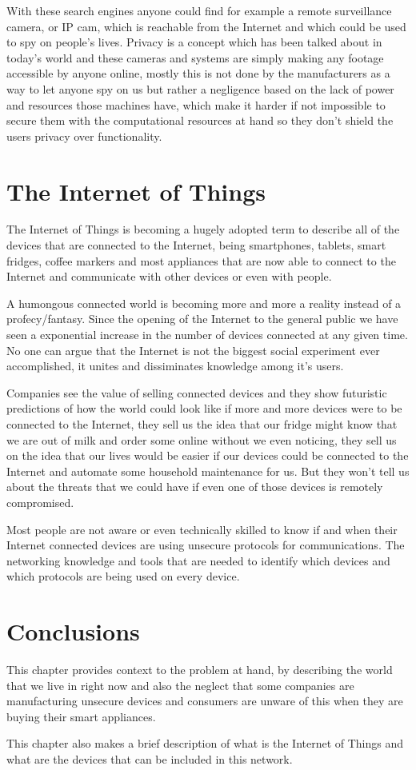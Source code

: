 With these search engines anyone could find for example a remote surveillance
camera, or IP cam, which is reachable from the Internet and which could be used
to spy on people's lives. Privacy is a concept which has been talked about in
today's world and these cameras and systems are simply making any footage
accessible by anyone online, mostly this is not done by the manufacturers as a
way to let anyone spy on us but rather a negligence based on the lack of power
and resources those machines have, which make it harder if not impossible to
secure them with the computational resources at hand so they don't shield the
users privacy over functionality.

\section{The Internet of Things}
\label{chap2:sec:iot}
The Internet of Things is becoming a hugely adopted term to describe all of the
devices that are connected to the Internet, being smartphones, tablets, smart
fridges, coffee markers and most appliances that are now able to connect to the
Internet and communicate with other devices or even with people.

A humongous connected world is becoming more and more a reality instead of a
profecy/fantasy. Since the opening of the Internet to the general public we
have seen a exponential increase in the number of devices connected at any
given time. No one can argue that the Internet is not the biggest social
experiment ever accomplished, it unites and dissiminates knowledge among it's
users.

Companies see the value of selling connected devices and they show futuristic
predictions of how the world could look like if more and more devices were to
be connected to the Internet, they sell us the idea that our fridge might know
that we are out of milk and order some online without we even noticing, they
sell us on the idea that our lives would be easier if our devices could be
connected to the Internet and automate some household maintenance for us. But
they won't tell us about the threats that we could have if even one of those
devices is remotely compromised.

Most people are not aware or even technically skilled to know if and when their
Internet connected devices are using unsecure protocols for communications. The
networking knowledge and tools that are needed to identify which devices and
which protocols are being used on every device.

\section{Conclusions}
\label{chap2:sec:concs}
This chapter provides context to the problem at hand, by describing the world
that we live in right now and also the neglect that some companies are
manufacturing unsecure devices and consumers are unware of this when they are
buying their smart appliances.

This chapter also makes a brief description of what is the Internet of Things
and what are the devices that can be included in this network.
